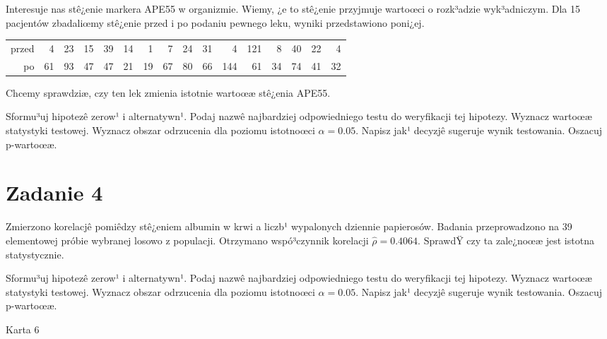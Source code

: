 \documentclass[a4paper,12pt]{article}
\begin{document}
  Interesuje nas stê¿enie markera APE55  w organizmie. 
  Wiemy, ¿e to stê¿enie przyjmuje wartoœci o rozk³adzie wyk³adniczym. 
  Dla 15 pacjentów zbadaliœmy stê¿enie przed i po podaniu pewnego leku, 
  wyniki przedstawiono poni¿ej.
  
  \vspace{0.5cm} 
  \noindent\begin{center} 
\begin{tabular}{rrrrrrrrrrrrrrrr}
  \hline
  \hline
przed & 4 & 23 & 15 & 39 & 14 & 1 & 7 & 24 & 31 & 4 & 121 & 8 & 40 & 22 & 4 \\
  po & 61 & 93 & 47 & 47 & 21 & 19 & 67 & 80 & 66 & 144 & 61 & 34 & 74 & 41 & 32 \\
   \hline
\end{tabular}
 
  \end{center} 
  \vspace{0.5cm}
  
  Chcemy sprawdziæ, czy ten lek zmienia istotnie wartoœæ stê¿enia APE55.
  
  Sformu³uj hipotezê zerow¹ i alternatywn¹. 
  Podaj nazwê najbardziej odpowiedniego testu do weryfikacji tej hipotezy. 
  Wyznacz wartoœæ statystyki testowej. 
  Wyznacz obszar odrzucenia dla poziomu istotnoœci $\alpha=0.05$. 
  Napisz jak¹ decyzjê sugeruje wynik testowania. Oszacuj p-wartoœæ. \vspace{1cm} 

  \section*{Zadanie 4}
     
     Zmierzono korelacjê pomiêdzy stê¿eniem albumin w krwi a liczb¹ wypalonych dziennie papierosów. 
     Badania przeprowadzono na 39 elementowej próbie wybranej losowo z populacji. 
     Otrzymano wspó³czynnik korelacji $\hat\rho = 0.4064 $. 
     SprawdŸ czy ta zale¿noœæ jest istotna statystycznie. 
     
     Sformu³uj hipotezê zerow¹ i alternatywn¹. 
     Podaj nazwê najbardziej odpowiedniego testu do weryfikacji tej hipotezy. 
     Wyznacz wartoœæ statystyki testowej. 
     Wyznacz obszar odrzucenia dla poziomu istotnoœci $\alpha=0.05$. 
     Napisz jak¹ decyzjê sugeruje wynik testowania. 
     Oszacuj p-wartoœæ. \vspace{1cm} 

  \clearpage  Karta  6  
\end{document}
